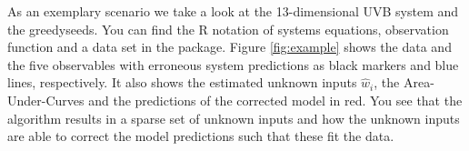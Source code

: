 As an exemplary scenario we take a look at the 13-dimensional UVB system and the 
\textsf{greedyseeds}. You can find the R notation of systems equations, observation function 
and a data set in the package. 
%
Figure \ref{fig:example} shows the data and the five observables with erroneous system
predictions as black markers and blue lines, respectively. It also shows the estimated unknown 
inputs $\hat{w}_i$, the Area-Under-Curves and the predictions of the corrected model in red.
You see that the algorithm results in a sparse set of unknown inputs and how the unknown 
inputs are able to correct the model predictions such that these fit the data.